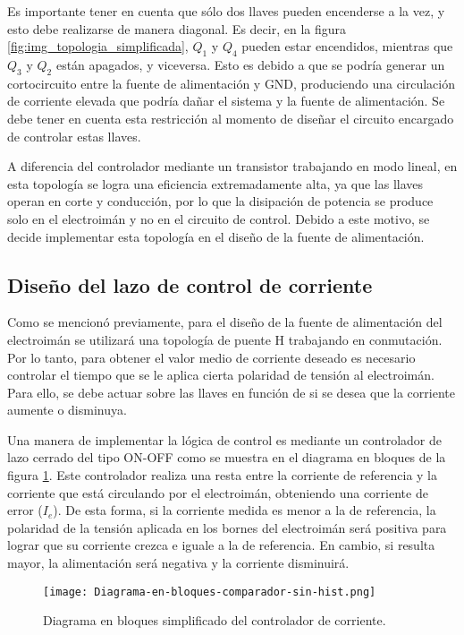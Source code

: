 Es importante tener en cuenta que sólo dos llaves pueden encenderse a la vez, y esto debe realizarse de manera diagonal. Es decir, en la figura \ref{fig:img_topologia_simplificada}, $Q_1$ y $Q_4$ pueden estar encendidos, mientras que $Q_3$ y $Q_2$ están apagados, y viceversa. Esto es debido a que se podría generar un cortocircuito entre la fuente de alimentación y GND, produciendo una circulación de corriente elevada que podría dañar el sistema y la fuente de alimentación. Se debe tener en cuenta esta restricción al momento de diseñar el circuito encargado de controlar estas llaves.

A diferencia del controlador mediante un transistor trabajando en modo lineal, en esta topología se logra una eficiencia extremadamente alta, ya que las llaves operan en corte y conducción, por lo que la disipación de potencia se produce solo en el electroimán y no en el circuito de control. Debido a este motivo, se decide implementar esta topología en el diseño de la fuente de alimentación.

\subsection{Diseño del lazo de control de corriente}

Como se mencionó previamente, para el diseño de la fuente de alimentación del electroimán se utilizará una topología de puente H trabajando en conmutación. Por lo tanto, para obtener el valor medio de corriente deseado es necesario controlar el tiempo que se le aplica cierta polaridad de tensión al electroimán. Para ello, se debe actuar sobre las llaves en función de si se desea que la corriente aumente o disminuya.

Una manera de implementar la lógica de control es mediante un controlador de lazo cerrado del tipo ON-OFF como se muestra en el diagrama en bloques de la figura \ref{fig:img_diag-en-bloques-comparador-sin-hist}. Este controlador realiza una resta entre la corriente de referencia y la corriente que está circulando por el electroimán, obteniendo una corriente de error ($I_e$). De esta forma, si la corriente medida es menor a la de referencia, la polaridad de la tensión aplicada en los bornes del electroimán será positiva para lograr que su corriente crezca e iguale a la de referencia. En cambio, si resulta mayor, la alimentación será negativa y la corriente disminuirá.

\begin{figure}[H]
	\centering
	\texttt{[image: Diagrama-en-bloques-comparador-sin-hist.png]}
	\caption{Diagrama en bloques simplificado del controlador de corriente.}
	\label{fig:img_diag-en-bloques-comparador-sin-hist}
\end{figure}



